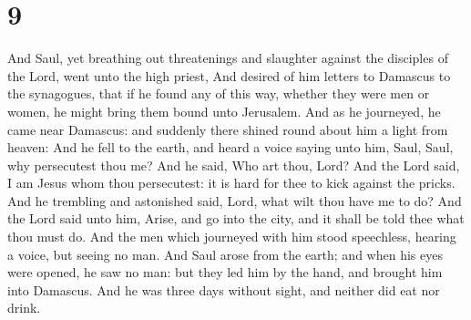 \hypertarget{section-8}{%
\section{9}\label{section-8}}

 And Saul, yet breathing out threatenings and slaughter
against the disciples of the Lord, went unto the high priest,
 And desired of him letters to Damascus to the synagogues,
that if he found any of this way, whether they were men or women, he
might bring them bound unto Jerusalem.  And as he journeyed,
he came near Damascus: and suddenly there shined round about him a light
from heaven:  And he fell to the earth, and heard a voice
saying unto him, Saul, Saul, why persecutest thou me?  And
he said, Who art thou, Lord? And the Lord said, I am Jesus whom thou
persecutest: it is hard for thee to kick against the pricks.
 And he trembling and astonished said, Lord, what wilt thou
have me to do? And the Lord said unto him, Arise, and go into the city,
and it shall be told thee what thou must do.  And the men
which journeyed with him stood speechless, hearing a voice, but seeing
no man.  And Saul arose from the earth; and when his eyes
were opened, he saw no man: but they led him by the hand, and brought
him into Damascus.  And he was three days without sight, and
neither did eat nor drink.

